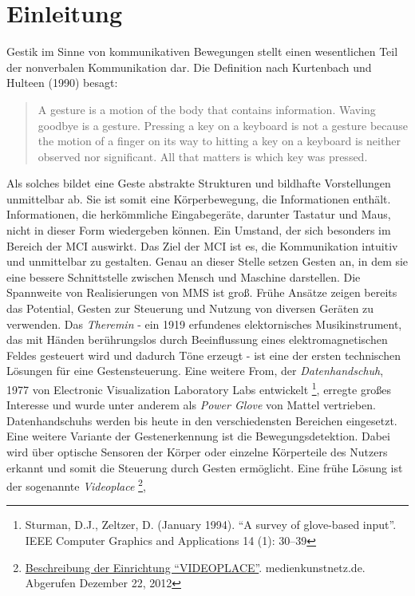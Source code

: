 \chapter{Einleitung}
\label{chap:Einleitung}
Gestik im Sinne von kommunikativen Bewegungen stellt einen wesentlichen Teil der nonverbalen Kommunikation dar. Die Definition nach Kurtenbach und Hulteen (1990) besagt:
\begin{quote}
A gesture is a motion of the body that contains information. Waving goodbye is a gesture.
Pressing a key on a keyboard is not a gesture because the motion of a finger on its way to hitting a key on a keyboard is neither observed nor significant.
All that matters is which key was pressed.
\end{quote}
Als solches bildet eine Geste abstrakte Strukturen und bildhafte Vorstellungen unmittelbar ab. Sie ist somit eine K\"orperbewegung, 
die Informationen enth\"alt. Informationen, die herk\"ommliche Eingabeger\"ate, darunter Tastatur und Maus, nicht in dieser Form wiedergeben k\"onnen.
Ein Umstand, der sich besonders im Bereich der \gls{MCI} auswirkt.
\newline
Das Ziel der \gls{MCI} ist es, die Kommunikation intuitiv und unmittelbar zu gestalten.
Genau an dieser Stelle setzen Gesten an, in dem sie eine bessere Schnittstelle zwischen Mensch und Maschine darstellen.
\newline
Die Spannweite von Realisierungen von \gls{MMS} ist gro\ss .
Fr\"uhe Ans\"atze zeigen bereits das Potential, Gesten zur Steuerung und Nutzung von diversen Ger\"aten zu verwenden.
Das \textit{Theremin} - 
ein 1919 erfundenes elektornisches Musikinstrument, das mit H\"anden ber\"uhrungslos durch Beeinflussung eines elektromagnetischen Feldes 
gesteuert wird und dadurch T\"one erzeugt - ist eine der ersten technischen L\"osungen f\"ur eine Gestensteuerung.
Eine weitere From, der \textit{\gls{Datenhandschuh}}, 1977 von Electronic Visualization Laboratory Labs entwickelt
\footnote{Sturman, D.J., Zeltzer, D. (January 1994). \enquote{A survey of glove-based input}. IEEE Computer Graphics and Applications 14 (1): 30–39}, 
erregte gro\ss es Interesse und wurde unter anderem als \textit{Power Glove} von Mattel vertrieben.
\glspl{Datenhandschuh} werden bis heute in den verschiedensten Bereichen eingesetzt.
\newline
Eine weitere Variante der Gestenerkennung ist die \gls{Bewegungsdetektion}. Dabei wird \"uber optische Sensoren der K\"orper oder einzelne K\"orperteile
des Nutzers erkannt und somit die Steuerung durch Gesten erm\"oglicht. Eine fr\"uhe L\"osung ist der sogenannte \textit{Videoplace} \footnote{\href{http://www.medienkunstnetz.de/works/videoplace/}{Beschreibung der Einrichtung \enquote{VIDEOPLACE}}. medienkunstnetz.de. Abgerufen Dezember 22, 2012},
